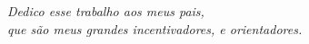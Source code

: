 \begin{dedicatoria}
   \vspace*{\fill}
   \centering
   \noindent
   \textit{ Dedico esse trabalho aos meus pais,\\
   que são meus grandes incentivadores, e orientadores.} \vspace*{\fill}
\end{dedicatoria}